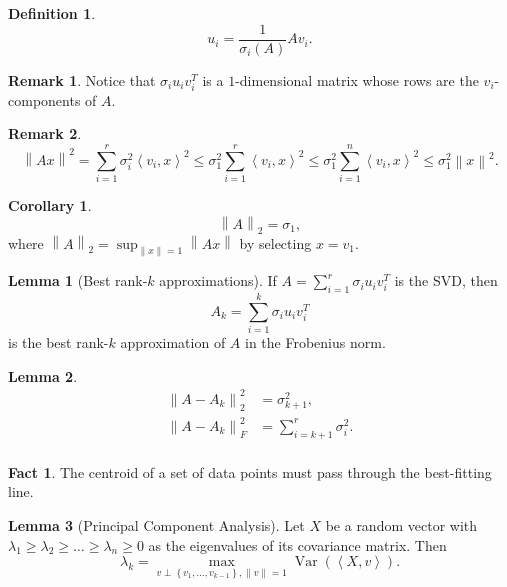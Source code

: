 \documentclass{article}
\theoremstyle{definition}
\newtheorem{definition}{Definition}[section]
\newtheorem{lemma}{Lemma}[section]
\newtheorem{fact}{Fact}[section]
\newtheorem{corollary}{Corollary}[section]
\newtheorem{remark}{Remark}[section]
\begin{document}
  \begin{definition}
    \[
      u_i = \frac{1}{\sigma_{i}(A)} Av_{i}.
    \]
  \end{definition}

  \begin{remark}
    Notice that \( \sigma_{i} u_{i}v_{i}^{T} \) is a \( 1
    \)-dimensional matrix whose rows are the \( v_{i} \)-components
    of \( A \).
  \end{remark}

  \begin{remark}
    \[
      \left\| Ax \right\|^{2} = \sum_{i=1}^{r} \sigma_{i}^{2}
      \left\langle v_{i}, x \right\rangle^{2} \leq \sigma_{1}^{2}
      \sum_{i=1}^{r} \left\langle v_{i}, x \right\rangle^{2} \leq
      \sigma_{1}^{2} \sum_{i=1}^{n} \left\langle v_{i}, x
      \right\rangle^{2} \leq \sigma_{1}^{2} \left\| x \right\|^{2}.
    \]
  \end{remark}

  \begin{corollary}
    \[
      \left\| A \right\|_{2} = \sigma_{1},
    \]
    where \( \left\| A \right\|_{2} = \sup_{\left\| x \right\| = 1}
    \left\| Ax \right\| \) by selecting \( x = v_{1}\).
  \end{corollary}

  \begin{lemma}[Best rank-\( k \) approximations]
    If \( A = \sum_{i=1}^{r} \sigma_{i}u_{i}v_{i}^{T} \) is the SVD, then
    \[
      A_k = \sum_{i=1}^{k} \sigma_{i} u_{i}v_{i}^{T}
    \]
    is the best rank-\( k \) approximation of \( A \) in the Frobenius norm.
  \end{lemma}

  \begin{lemma}
    \[
      \begin{aligned}
        \left\|A - A_{k}\right\|_{2}^{2} &= \sigma_{k+1}^{2}, \\
        \left\|A - A_{k}\right\|_{F}^{2} &= \sum_{i=k+1}^{r} \sigma_{i}^{2}. \\
      \end{aligned}
    \]
  \end{lemma}

  \begin{fact}
    The centroid of a set of data points must pass through the
    best-fitting line.
  \end{fact}

  \begin{lemma}[Principal Component Analysis]
    Let \( X \) be a random vector with \( \lambda_1 \geq \lambda_2
    \geq \dots \geq \lambda_n \geq 0  \) as the eigenvalues of its
    covariance matrix. Then
    \[
      \lambda_k = \max_{v \perp \left\{ v_1, \dots, v_{k-1} \right\},
      \left\|v\right\| = 1} \operatorname{Var}(\left\langle X,
      v \right\rangle).
    \]
  \end{lemma}
\end{document}
